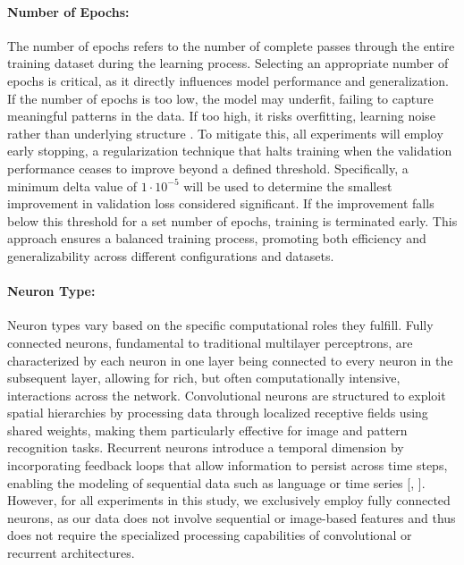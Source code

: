 \paragraph{Number of Epochs:} The number of epochs refers to the number of complete passes through the entire training dataset during the learning process. Selecting an appropriate number of epochs is critical, as it directly influences model performance and generalization. If the number of epochs is too low, the model may underfit, failing to capture meaningful patterns in the data. If too high, it risks overfitting, learning noise rather than underlying structure \cite{Berahmand24}. To mitigate this, all experiments will employ early stopping, a regularization technique that halts training when the validation performance ceases to improve beyond a defined threshold. Specifically, a minimum delta value of $1\cdot10^{-5}$ will be used to determine the smallest improvement in validation loss considered significant. If the improvement falls below this threshold for a set number of epochs, training is terminated early. This approach ensures a balanced training process, promoting both efficiency and generalizability across different configurations and datasets.

\paragraph{Neuron Type:} Neuron types vary based on the specific computational roles they fulfill. Fully connected neurons, fundamental to traditional multilayer perceptrons, are characterized by each neuron in one layer being connected to every neuron in the subsequent layer, allowing for rich, but often computationally intensive, interactions across the network. Convolutional neurons are structured to exploit spatial hierarchies by processing data through localized receptive fields using shared weights, making them particularly effective for image and pattern recognition tasks. Recurrent neurons introduce a temporal dimension by incorporating feedback loops that allow information to persist across time steps, enabling the modeling of sequential data such as language or time series [\cite{Berahmand24}, \cite{Charte18}]. However, for all experiments in this study, we exclusively employ fully connected neurons, as our data does not involve sequential or image-based features and thus does not require the specialized processing capabilities of convolutional or recurrent architectures.

